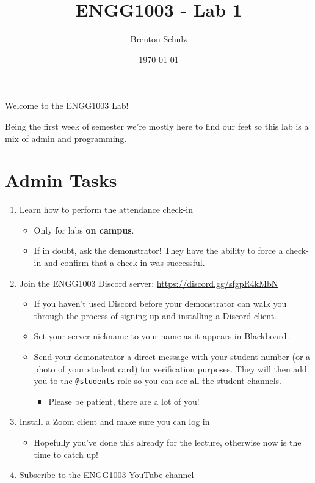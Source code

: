 \documentclass{lab}
\title{ENGG1003 - Lab 1}
\author{Brenton Schulz}
\date{\today}
\begin{document}
\maketitle

Welcome to the ENGG1003 Lab!

Being the first week of semester we're mostly here to find our feet so this lab is a mix of admin and programming.

\section{Admin Tasks}

\begin{enumerate}
\item Learn how to perform the attendance check-in
	\begin{itemize}
		\item Only for labs \textbf{on campus}.
		\item If in doubt, ask the demonstrator! They have the ability to force a check-in and confirm that a check-in was successful.
	\end{itemize}
\item Join the ENGG1003 Discord server: \url{https://discord.gg/sfgpR4kMbN}
	\begin{itemize}
		\item If you haven't used Discord before your demonstrator can walk you through the process of signing up and installing a Discord client.
		\item Set your server nickname to your name as it appears in Blackboard.
		\item Send your demonstrator a direct message with your student number (or a photo of your student card) for verification purposes. They will then add you to the \texttt{@students} role so you can see all the student channels.
			\begin{itemize}
				\item Please be patient, there are a lot of you!
			\end{itemize}
	\end{itemize}
\item Install a Zoom client and make sure you can log in
	\begin{itemize}
		\item Hopefully you've done this already for the lecture, otherwise now is the time to catch up!
	\end{itemize}
\item Subscribe to the ENGG1003 YouTube channel

\end{enumerate}
\end{document}
